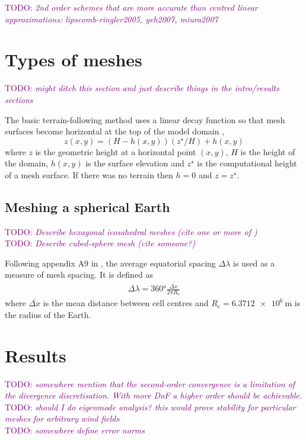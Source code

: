 \documentclass[times]{elsarticle}
\newcommand{\TODO}[1]{\textcolor{purple}{TODO: \emph{#1}}}
\begin{document}
\TODO{2nd order schemes that are more accurate than centred linear approximations: lipscomb-ringler2005, yeh2007, miura2007}

\section{Types of meshes}
\TODO{might ditch this section and just describe things in the intro/results sections}

The basic terrain-following method uses a linear decay function so that mesh surfaces become horizontal at the top of the model domain \citep{galchen-somerville1975},
\begin{equation}
	z(x,y) = \left( H - h(x,y) \right) \left( z^\star / H \right) + h(x,y) \label{eqn:btf}
\end{equation}
where $z$ is the geometric height at a horizontal point $(x, y)$, $H$ is the height of the domain, $h(x,y)$ is the surface elevation and $z^\star$ is the computational height of a mesh surface.  If there was no terrain then $h = 0$ and $z = z^\star$.

\subsection{Meshing a spherical Earth}

\TODO{Describe hexagonal icosahedral meshes (cite one or more of \citep{thuburn2014,heikes-randall1995a,heikes-randall1995b})} \\
\TODO{Describe cubed-sphere mesh (cite someone?)}

Following appendix A9 in \citep{lauritzen2014}, the average equatorial spacing $\Delta \lambda$ is used as a measure of mesh spacing.  It is defined as
\begin{align}
	\Delta \lambda = \ang{360} \frac{\overline{\Delta x}}{2 \pi R_e}
\end{align}
where $\overline{\Delta x}$ is the mean distance between cell centres and $R_e = \SI{6.3712e6}{\meter}$ is the radius of the Earth.



\section{Results}
\label{sec:results}

\TODO{somewhere mention that the second-order convergence is a limitation of the divergence discretisation.  With more DoF a higher order should be achievable.} \\
\TODO{should I do eigenmode analysis?  this would prove stability for particular meshes for arbitrary wind fields} \\
\TODO{somewhere define error norms}
\end{document}
